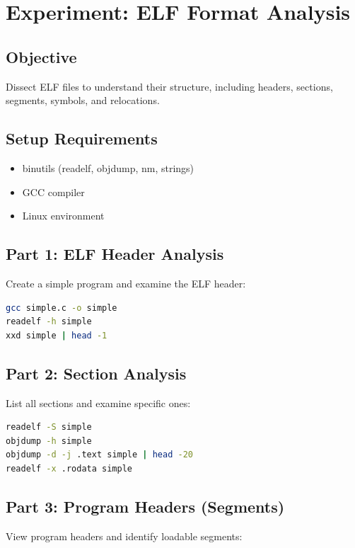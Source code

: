 \section{Experiment: ELF Format Analysis}

\subsection{Objective}
Dissect ELF files to understand their structure, including headers, sections, segments, symbols, and relocations.

\subsection{Setup Requirements}
\begin{itemize}
\item binutils (readelf, objdump, nm, strings)
\item GCC compiler
\item Linux environment
\end{itemize}

\subsection{Part 1: ELF Header Analysis}

Create a simple program and examine the ELF header:

\begin{lstlisting}[language=bash]
gcc simple.c -o simple
readelf -h simple
xxd simple | head -1
\end{lstlisting}

\subsection{Part 2: Section Analysis}

List all sections and examine specific ones:

\begin{lstlisting}[language=bash]
readelf -S simple
objdump -h simple
objdump -d -j .text simple | head -20
readelf -x .rodata simple
\end{lstlisting}

\subsection{Part 3: Program Headers (Segments)}

View program headers and identify loadable segments:

